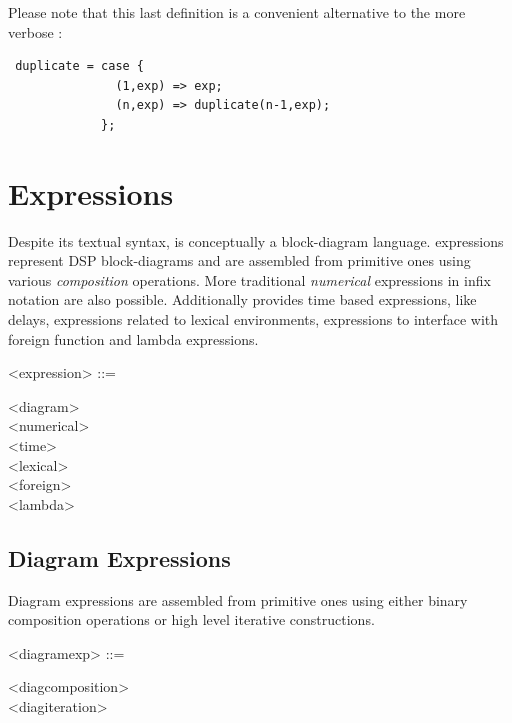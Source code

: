 \documentclass[a4paper]{book}
\begin{document}
Please note that this last definition is a convenient alternative to the more verbose :
\begin{lstlisting}
 duplicate = case { 
               (1,exp) => exp; 
               (n,exp) => duplicate(n-1,exp); 
             };
\end{lstlisting}

 
  
\section{Expressions}

Despite its textual syntax, \faust is conceptually a block-diagram language. \faust expressions represent DSP block-diagrams and are assembled from primitive ones using various \textit{composition} operations. More traditional \textit{numerical} expressions in infix notation are also possible. Additionally \faust provides time based expressions, like delays, expressions related to lexical environments, expressions to interface with foreign function and lambda expressions.

\begin{grammar}
  <expression> ::= 
  \begin{syntdiag}
    \begin{stack}
      <diagram>\\
      <numerical>\\
      <time>\\
      <lexical>\\
      <foreign>\\
      <lambda>
    \end{stack}
  \end{syntdiag}
\end{grammar}
  
\subsection{Diagram Expressions}

Diagram expressions are assembled from primitive ones using either binary composition operations or high level iterative constructions.
 
\begin{grammar}
  <diagramexp> ::= 
  \begin{syntdiag}
    \begin{stack}
      <diagcomposition>\\
      <diagiteration>
    \end{stack}
  \end{syntdiag}
\end{grammar}
\end{document}
